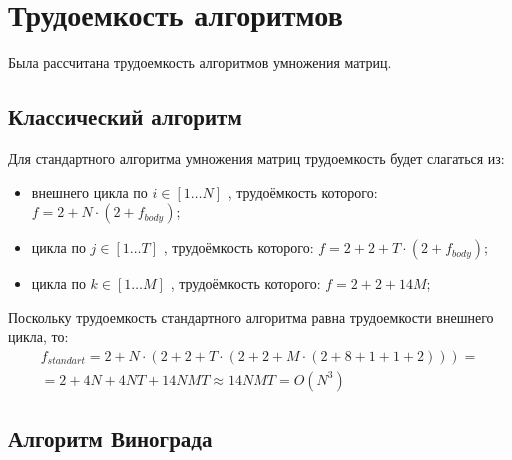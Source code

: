 \section{Трудоемкость алгоритмов}

Была рассчитана трудоемкость алгоритмов умножения матриц.

\subsection{Классический алгоритм}

Для стандартного алгоритма умножения матриц трудоемкость будет слагаться из:

\begin{itemize}[label=---]
	\item внешнего цикла по $i \in [1 \ldots N]$ , трудоёмкость которого: $f = 2 + N \cdot (2 + f_{body})$;
	\item цикла по $j \in [1 \ldots T]$ , трудоёмкость которого: $f = 2 + 2 + T \cdot (2 + f_{body})$;
	\item цикла по $k \in [1 \ldots M]$ , трудоёмкость которого: $f = 2 + 2 + 14M$;
\end{itemize}

Поскольку трудоемкость стандартного алгоритма равна трудоемкости внешнего цикла, то:
\begin{equation}
	\label{сomplexity:standart}
	\begin{gathered}
		f_{standart} = 2 + N \cdot (2 + 2 + T \cdot (2 + 2 + M \cdot (2 + 8 + 1 + 1 + 2)))= \\
		= 2 + 4N + 4NT + 14NMT \approx 14NMT = O(N^3)
	\end{gathered}
\end{equation}

\clearpage

\subsection{Алгоритм Винограда}

